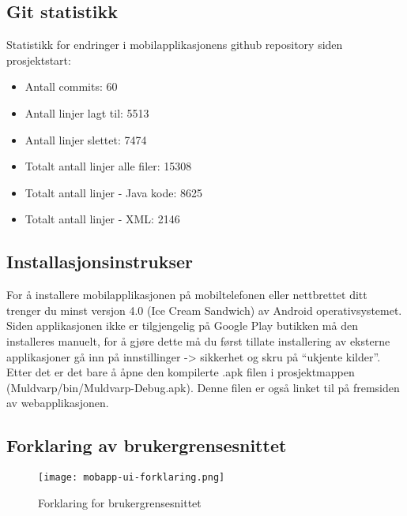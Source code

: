 \documentclass[../main.tex]{subfiles}
\begin{document}
\subsection{Git statistikk}

Statistikk for endringer i mobilapplikasjonens github repository siden prosjektstart:
\begin{itemize}
\item Antall commits: 60
\item Antall linjer lagt til: 5513
\item Antall linjer slettet: 7474
\item Totalt antall linjer alle filer: 15308
\item Totalt antall linjer - Java kode: 8625
\item Totalt antall linjer - XML: 2146
\end{itemize}

\subsection{Installasjonsinstrukser}

For å installere mobilapplikasjonen på mobiltelefonen eller nettbrettet ditt trenger du minst versjon 4.0 (Ice Cream Sandwich) av Android operativsystemet. Siden applikasjonen ikke er tilgjengelig på Google Play butikken må den installeres manuelt, for å gjøre dette må du først tillate installering av eksterne applikasjoner gå inn på innstillinger -> sikkerhet og skru på “ukjente kilder”. Etter det er det bare å åpne den kompilerte .apk filen i prosjektmappen (Muldvarp/bin/Muldvarp-Debug.apk). Denne filen er også 
linket til på fremsiden av webapplikasjonen.

\subsection{Forklaring av brukergrensesnittet}

\begin{figure}[H]
  \centering
  \texttt{[image: mobapp-ui-forklaring.png]}
  \caption{Forklaring for brukergrensesnittet}
\end{figure}
\end{document}

